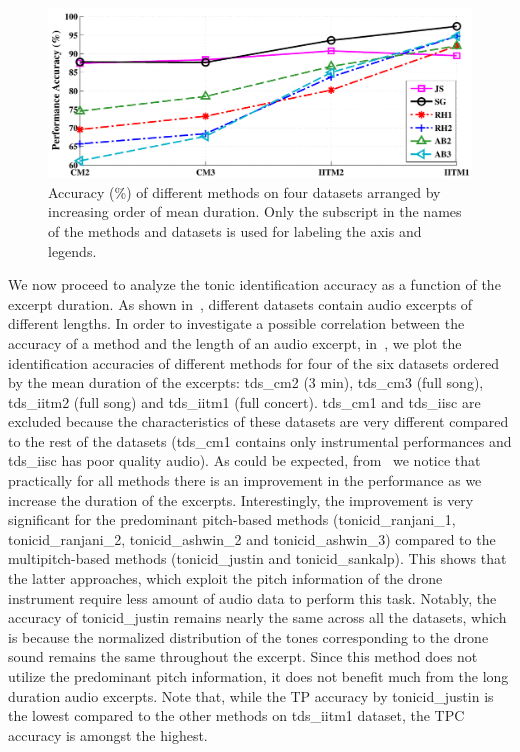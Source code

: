 {\begin{figure}
	\begin{center}
		\includegraphics[width=\figSizeNinety]{ch05_preprocessing/figures/Accuracy_Length.pdf}
	\end{center}
	\caption[Tonic identification accuracies of different approaches on four datasets]{Accuracy (\%) of different methods on four datasets arranged by increasing order of mean duration. Only the subscript in the names of the methods and datasets is used for labeling the axis and legends.}
	\label{fig:tonic_id_accuracy_vs_length}
\end{figure}


We now proceed to analyze the tonic identification accuracy as a function of the excerpt duration. As shown in~, different datasets contain audio excerpts of different lengths. In order to investigate a possible correlation between the accuracy of a method and the length of an audio
excerpt, in~, we plot the identification accuracies of different methods for four of the six datasets ordered
by the mean duration of the excerpts: \acrshort{tds_cm2} (3 min), \acrshort{tds_cm3} (full song), \acrshort{tds_iitm2} (full song) and \acrshort{tds_iitm1} (full concert). \acrshort{tds_cm1} and \acrshort{tds_iisc} are excluded because the characteristics of these datasets are very different compared to the rest of the datasets (\acrshort{tds_cm1} contains only instrumental performances and \acrshort{tds_iisc} has poor quality audio). As could be expected, from~ we notice that practically for all methods there is an improvement in the performance as we increase the duration
of the excerpts. Interestingly, the improvement is very significant for the predominant pitch-based methods (\acrshort{tonicid_ranjani_1}, \acrshort{tonicid_ranjani_2}, \acrshort{tonicid_ashwin_2} and \acrshort{tonicid_ashwin_3}) compared to the multipitch-based methods (\acrshort{tonicid_justin} and \acrshort{tonicid_sankalp}). This shows that the latter approaches, which exploit the pitch information of the drone instrument require less amount of audio data to perform this task. Notably, the accuracy of \acrshort{tonicid_justin} remains nearly the same across all the datasets, which is because the normalized distribution of the tones corresponding to the drone sound remains the same throughout the excerpt. Since this method does not utilize the predominant pitch information, it does not benefit much from the long duration audio excerpts. Note that, while the TP accuracy by \acrshort{tonicid_justin} is the lowest compared to the other methods on \acrshort{tds_iitm1} dataset, the TPC accuracy is amongst the highest. 

}
